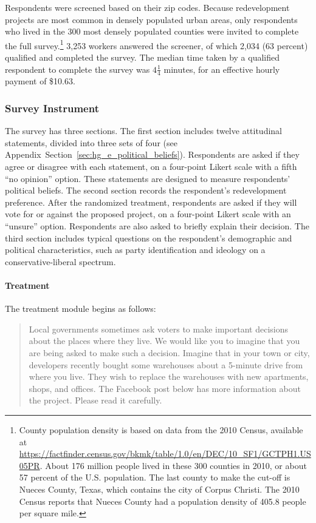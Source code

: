 \documentclass[article,12pt]{memoir}
\begin{document}
Respondents were screened based on their zip codes.  Because redevelopment projects are most common in densely populated urban areas, only respondents who lived in the 300 most densely populated counties were invited to complete the full survey.\footnote{County population density is based on data from the 2010 Census, available at \url{https://factfinder.census.gov/bkmk/table/1.0/en/DEC/10_SF1/GCTPH1.US05PR}. About 176 million people lived in these 300 counties in 2010, or about 57 percent of the U.S. population. The last county to make the cut-off is Nueces County, Texas, which contains the city of Corpus Christi. The 2010 Census reports that Nueces County had a population density of 405.8 people per square mile.} 3,253 workers answered the screener, of which 2,034 (63 percent) qualified and completed the survey.  The median time taken by a qualified respondent to complete the survey was $4 \frac 14$ minutes, for an effective hourly payment of \$10.63.

\subsubsection{Survey Instrument}

The survey has three sections.  The first section includes twelve attitudinal statements, divided into three sets of four (see Appendix~Section~\ref{sec:hg_e_political_beliefs}).  Respondents are asked if they agree or disagree with each statement, on a four-point Likert scale with a fifth ``no opinion'' option.  These statements are designed to measure respondents' political beliefs.  The second section records the respondent's redevelopment preference.  After the randomized treatment, respondents are asked if they will vote for or against the proposed project, on a four-point Likert scale with an ``unsure'' option.  Respondents are also asked to briefly explain their decision.  The third section includes typical questions on the respondent's demographic and political characteristics, such as party identification and ideology on a conservative-liberal spectrum.

\paragraph{Treatment} The treatment module begins as follows:

  \begin{quote}
  \begin{SingleSpace}
  Local governments sometimes ask voters to make important decisions about the places where they live. We would like you to imagine that you are being asked to make such a decision.  Imagine that in your town or city, developers recently bought some warehouses about a 5-minute drive from where you live. They wish to replace the warehouses with new apartments, shops, and offices. The Facebook post below has more information about the project. Please read it carefully.\end{SingleSpace}
  \end{quote}
\end{document}
